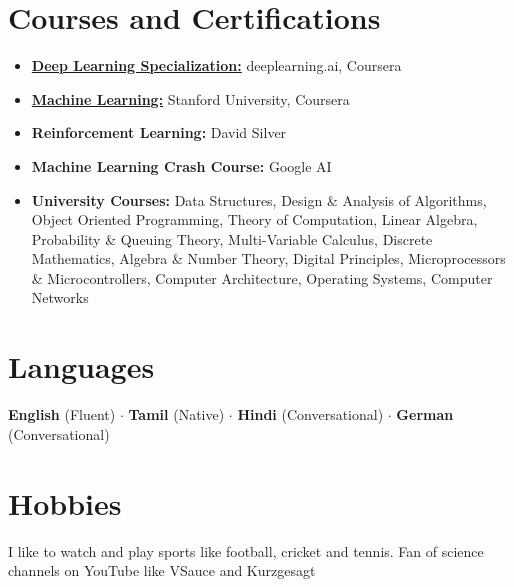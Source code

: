 \documentclass[letterpaper,11pt]{article}
\newcommand{\resumeItem}[2]{
\item\small{
\textbf{#1}{ #2 \vspace{-2pt} }
}
}
\newcommand{\resumeSubHeadingListStart}{\begin{itemize}[leftmargin=*]}
\newcommand{\resumeSubHeadingListEnd}{\end{itemize}}
\begin{document}
\section{Courses and Certifications}
\resumeSubHeadingListStart
\resumeItem{\href{https://www.coursera.org/account/accomplishments/specialization/certificate/GM2PFXFWUCYE}{\textsc{\icon{\faExternalLink}}Deep Learning Specialization:}}{deeplearning.ai, Coursera}
\resumeItem{\href{https://www.coursera.org/account/accomplishments/verify/PPV8YWPGZSHB}{\textsc{\icon{\faExternalLink}} Machine Learning:}}{Stanford University, Coursera}
\resumeItem{Reinforcement Learning:}{David Silver}
\resumeItem{Machine Learning Crash Course:}{Google AI}
\resumeItem{University Courses:}{Data Structures, Design \& Analysis of Algorithms, Object Oriented Programming, Theory of Computation, Linear Algebra, Probability \& Queuing Theory, Multi-Variable Calculus, Discrete Mathematics, Algebra \& Number Theory, Digital Principles, Microprocessors \& Microcontrollers, Computer Architecture, Operating Systems, Computer Networks}
\resumeSubHeadingListEnd

\section{Languages}
\textbf{English} (Fluent) $\cdot$ \textbf{Tamil} (Native) $\cdot$ \textbf{Hindi} (Conversational) $\cdot$ \textbf{German} (Conversational)

\section{Hobbies}
I like to watch and play sports like football, cricket and tennis. Fan of science channels on YouTube like VSauce and Kurzgesagt

\end{document}
